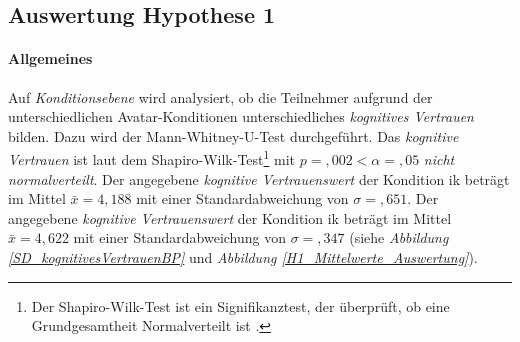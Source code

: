 \documentclass[a4paper,11pt]{article}%
\renewcommand{\\}{\vspace*{0.5\baselineskip} \newline}
\begin{document}
{%
%

\clearpage
\newpage	
	\subsection{Auswertung Hypothese 1}
	\label{Auswertung Hypothese 1}

\paragraph{Allgemeines}
Auf \textit{Konditionsebene} wird analysiert, ob die Teilnehmer aufgrund der unterschiedlichen Avatar-Konditionen unterschiedliches \textit{kognitives Vertrauen} bilden. Dazu wird der Mann-Whitney-U-Test durchgeführt.\\
Das \textit{kognitive Vertrauen} ist laut dem Shapiro-Wilk-Test\footnote{Der Shapiro-Wilk-Test ist ein Signifikanztest, der überprüft, ob eine Grundgesamtheit Normalverteilt ist \citep[S. 25]{razali2011power}.} mit $p =,002 < \alpha =,05$ \textit{nicht normalverteilt}.
Der angegebene \textit{kognitive Vertrauenswert} der Kondition \ac{ik} beträgt im Mittel $\bar{x} = 4,188$ mit einer Standardabweichung von $\sigma =,651$.\newline 
Der angegebene \textit{kognitive Vertrauenswert} der Kondition \ac{ik} beträgt im Mittel $\bar{x} = 4,622$ mit einer Standardabweichung von $\sigma =,347$ (siehe \textit{Abbildung \ref{SD_kognitivesVertrauenBP}} und \textit{Abbildung \ref{H1_Mittelwerte_Auswertung}}).

}
\end{document}
